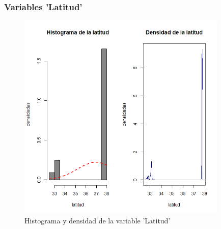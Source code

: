 \documentclass[12pt]{beamer}
\begin{document}
\begin{frame}
\frametitle{Variables 'Latitud'}
\begin{figure}[!h]
    \begin{center}
        \includegraphics[width=10cm]{imagenes/8.png}
        \caption{Histograma y densidad de la variable 'Latitud'}
        \label{fig:Densidad}
    \end{center}
\end{figure}
\end{frame}
\end{document}
